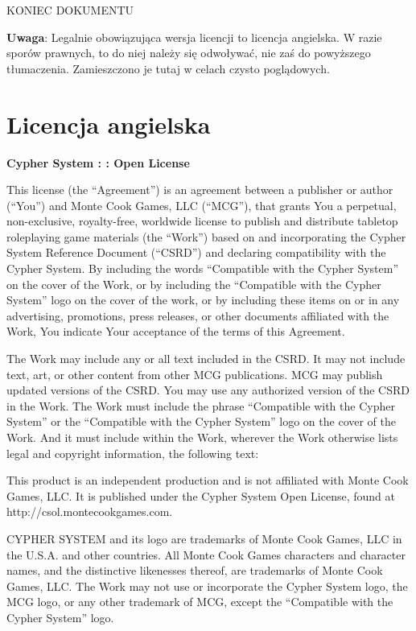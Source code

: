 KONIEC DOKUMENTU

{ \color{red} \textbf{Uwaga}}: Legalnie obowiązująca wersja licencji to licencja angielska. W razie sporów prawnych, to do niej należy się odwoływać, nie zaś do powyższego tłumaczenia. Zamieszczono je tutaj w celach czysto poglądowych.

\section{Licencja angielska}

\textbf{Cypher System : : Open License}

This license (the “Agreement”) is an agreement between a publisher or author (“You”) and Monte Cook Games, LLC (“MCG”), that grants You a perpetual, non-exclusive, royalty-free, worldwide license to publish and distribute tabletop roleplaying game materials (the “Work”) based on and incorporating the Cypher System Reference Document (“CSRD”) and declaring compatibility with the Cypher System. By including the words “Compatible with the Cypher System” on the cover of the Work, or by including the “Compatible with the Cypher System” logo on the cover of the work, or by including these items on or in any advertising, promotions, press releases, or other documents affiliated with the Work, You indicate Your acceptance of the terms of this Agreement.

The Work may include any or all text included in the CSRD. It may not include text, art, or other content from other MCG publications. MCG may publish updated versions of the CSRD. You may use any authorized version of the CSRD in the Work.
The Work must include the phrase “Compatible with the Cypher System” or the “Compatible with the Cypher System” logo on the cover of the Work. And it must include within the Work, wherever the Work otherwise lists legal and copyright information, the following text:

\begin{displayquote}
This product is an independent production and is not affiliated with Monte Cook Games, LLC. It is published under the Cypher System Open License, found at http://csol.montecookgames.com.

CYPHER SYSTEM and its logo are trademarks of Monte Cook Games, LLC in the U.S.A. and other countries. All Monte Cook Games characters and character names, and the distinctive likenesses thereof, are trademarks of Monte Cook Games, LLC.
The Work may not use or incorporate the Cypher System logo, the MCG logo, or any other trademark of MCG, except the “Compatible with the Cypher System” logo.
\end{displayquote}

